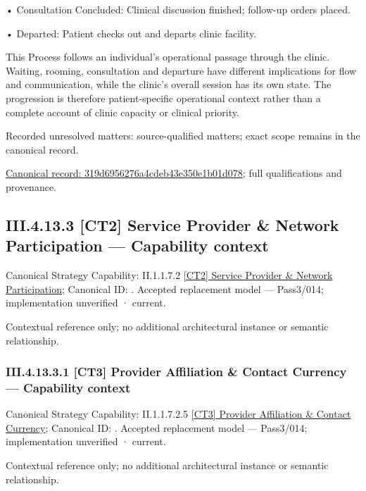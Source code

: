 •
Consultation Concluded: Clinical discussion finished; follow-up orders placed.



•
Departed: Patient checks out and departs clinic facility.



This Process follows an individual's operational passage through the clinic. Waiting, rooming, consultation and departure have different implications for flow and communication, while the clinic's overall session has its own state. The progression is therefore patient-specific operational context rather than a complete account of clinic capacity or clinical priority.


{\small Recorded unresolved matters: source-qualified matters; exact scope remains in the canonical record.}\par
{\footnotesize \href{../../../../../../../../continuum/business/business-process/319d6956276a4cdeb43e350e1b01d078.md}{Canonical record: 319d6956276a4cdeb43e350e1b01d078}; full qualifications and provenance.}\par
\subsection*{III.4.13.3 [CT2] Service Provider \& Network Participation — Capability context}
\label{navigation:III.4.13.3}

{\small Canonical Strategy Capability: II.1.1.7.2 \hyperref[element:ceca5f9bdddb4a39bab531595e3547ff]{[CT2] Service Provider \& Network Participation}; Canonical ID: \texttt{}. Accepted replacement model — Pass3/014; implementation unverified · current.}\par
Contextual reference only; no additional architectural instance or semantic relationship.\par
\subsubsection*{III.4.13.3.1 [CT3] Provider Affiliation \& Contact Currency — Capability context}
\label{navigation:III.4.13.3.1}

{\small Canonical Strategy Capability: II.1.1.7.2.5 \hyperref[element:26090bfba56a4a36a7a0f4158ef04c5a]{[CT3] Provider Affiliation \& Contact Currency}; Canonical ID: \texttt{}. Accepted replacement model — Pass3/014; implementation unverified · current.}\par
Contextual reference only; no additional architectural instance or semantic relationship.\par
